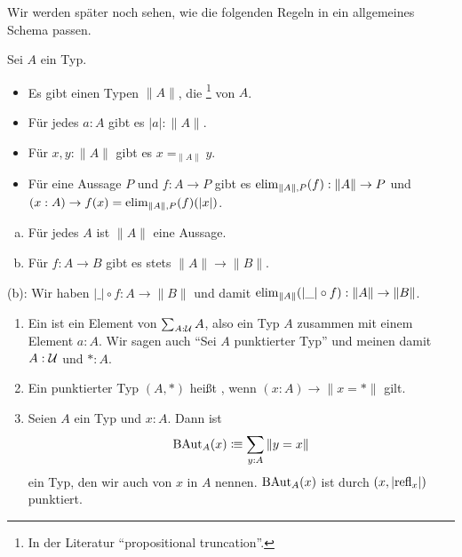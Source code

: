 Wir werden später noch sehen, wie die folgenden Regeln in ein allgemeines Schema passen.
\begin{regeln}
  Sei $A$ ein Typ.
  \begin{itemize}
  \item Es gibt einen Typen $\|A\|$, die \footnote{
    In der Literatur ``propositional truncation''.}
    von $A$.
  \item Für jedes $a:A$ gibt es $|a|:\|A\|$. 
  \item Für $x,y:\|A\|$ gibt es $x=_{\|A\|}y$.
  \item Für eine Aussage $P$ und $f:A\to P$ gibt es $\mathrm{elim}_{\|A\|,P}(f):\|A\|\to P$
     und $(x:A)\to f(x)=\mathrm{elim}_{\|A\|,P}(f)(|x|)$.
  \end{itemize}
\end{regeln}

\begin{bemerkung}
  \label{Veraussagung-Funktorialität}
  \begin{enumerate}[(a)]
  \item Für jedes $A$ ist $\|A\|$ eine Aussage.
  \item Für $f:A\to B$ gibt es stets $\|A\|\to\|B\|$.
  \end{enumerate}
\end{bemerkung}

\begin{beweis}  
  (b): Wir haben $|\_|\circ f:A\to \|B\|$ und damit $\mathrm{elim}_{\|A\|}(|\_|\circ f):\|A\|\to \|B\|$.
\end{beweis}

\begin{definition}
  \begin{enumerate}
  \item Ein  ist ein Element von $\sum_{A:\mathcal{U}}A$, also ein Typ $A$ zusammen mit einem Element $a:A$. Wir sagen auch ``Sei $A$ punktierter Typ'' und meinen damit $A:\mathcal{U}$ und $\ast:A$.
  \item Ein punktierter Typ $(A,\ast)$ heißt , wenn $(x:A)\to \|x=\ast\|$ gilt.
  \item Seien $A$ ein Typ und $x:A$.
  Dann ist 
  \[\mathrm{BAut}_A(x)\vcentcolon\mspace{-1.2mu}\equiv \sum_{y:A}\|y=x\|\]
  ein Typ, den wir auch  von $x$ in $A$ nennen.
  $\mathrm{BAut}_A(x)$ ist durch $(x,|\mathrm{refl}_x|)$ punktiert.
  \end{enumerate}
\end{definition}

